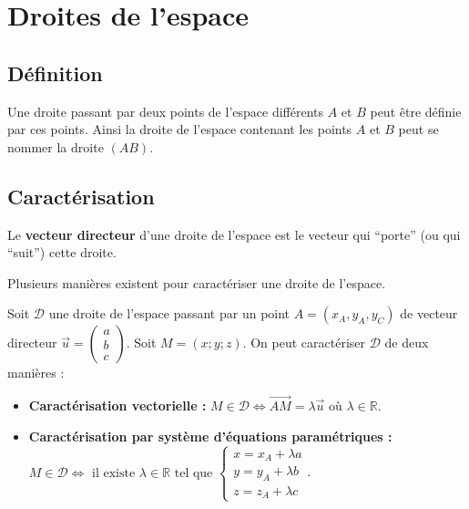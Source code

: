 	\section{Droites de l'espace}
	
	\subsection{Définition}
	
	Une droite passant par deux points de l'espace différents $A$ et $B$ peut être définie par ces points. Ainsi la droite de l'espace contenant les points $A$ et $B$ peut se nommer la droite $(AB)$.
	
	\subsection{Caractérisation}
	
	\begin{formula}
		Le \textbf{vecteur directeur} d'une droite de l'espace est le vecteur qui ``porte'' (ou qui ``suit'') cette droite.
	\end{formula}
	
	Plusieurs manières existent pour caractériser une droite de l'espace.
	
	\begin{formula}
		Soit $\mathcal{D}$ une droite de l'espace passant par un point $A = (x_A, y_A, y_C)$ de vecteur directeur $\overrightarrow{u} = \begin{pmatrix} a \\ b \\ c \end{pmatrix}$.
		\newpar
		Soit $M = (x; y; z)$. On peut caractériser $\mathcal{D}$ de deux manières :
		\begin{itemize}
			\item \textbf{Caractérisation vectorielle :}
			\newline
			$M \in \mathcal{D} \iff \overrightarrow{AM} = \lambda \overrightarrow{u}$ où $\lambda \in \mathbb{R}$.
			\item \textbf{Caractérisation par système d'équations paramétriques :}
			\newline
			$M \in \mathcal{D} \iff \text{ il existe } \lambda \in \mathbb{R} \text{ tel que } \begin{cases} x = x_A + \lambda a \\ y = y_A + \lambda b \\ z = z_A + \lambda c \end{cases}$.
		\end{itemize}
	\end{formula}
	
